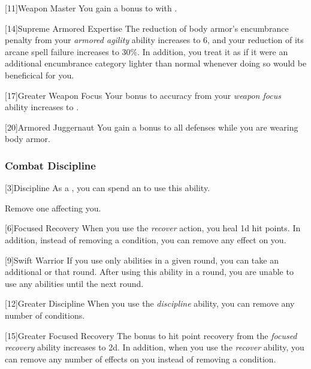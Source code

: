             [11]{Weapon Master} 
            You gain a  bonus to  with .

            [14]{Supreme Armored Expertise}
            The reduction of body armor's encumbrance penalty from your \textit{armored agility} ability increases to 6, and your reduction of its arcane spell failure increases to 30\%.
            In addition, you treat it as if it were an additional encumbrance category lighter than normal whenever doing so would be beneficical for you.

            [17]{Greater Weapon Focus} 
            Your bonus to accuracy from your \textit{weapon focus} ability increases to .

            [20]{Armored Juggernaut}
            You gain a  bonus to all defenses while you are wearing body armor.

        \subsubsection{Combat Discipline}

            [3]{Discipline} As a , you can spend an  to use this ability.
            \begin{ability}
                \begin{spelleffects}
                    \spelleffect Remove one  affecting you.
                \end{spelleffects}
            \end{ability}

            [6]{Focused Recovery}
            When you use the \textit{recover} action, you heal \plus1d hit points.
            In addition, instead of removing a condition, you can remove any  effect on you.

            [9]{Swift Warrior}
            If you use only  abilities in a given round, you can take an additional  or  that round.
            After using this ability in a round, you are unable to use any  abilities until the next round.

            [12]{Greater Discipline}
            When you use the \textit{discipline} ability, you can remove any number of conditions.

            [15]{Greater Focused Recovery}
            The bonus to hit point recovery from the \textit{focused recovery} ability increases to \plus2d.
            In addition, when you use the \textit{recover} ability, you can remove any number of  effects on you instead of removing a condition.

